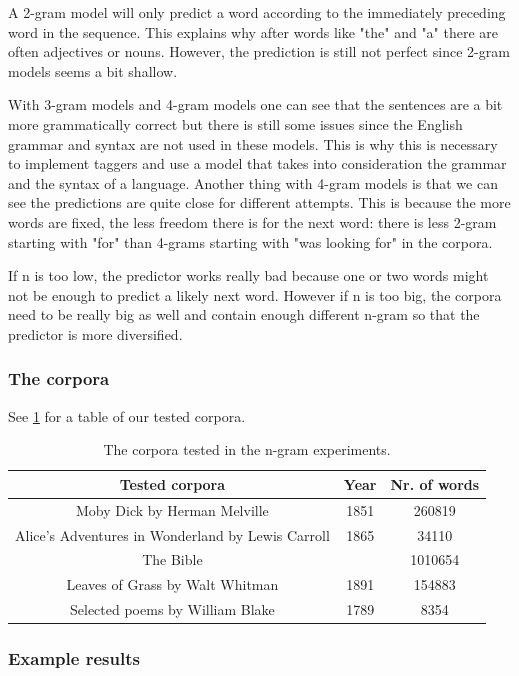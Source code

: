 \documentclass[a4paper,12pt]{article}
\begin{document}
A 2-gram model will only predict a word according to the immediately preceding word in the sequence. This explains why after words like "the" and "a" there are often adjectives or nouns. However, the prediction is still not perfect since 2-gram models seems a bit shallow.

With 3-gram models and 4-gram models one can see that the sentences are a bit more grammatically correct but there is still some issues since the English grammar and syntax are not used in these models. This is why this is necessary to implement taggers and use a model that takes into consideration the grammar and the syntax of a language. Another thing with 4-gram models is that we can see the predictions are quite close for different attempts. This is because the more words are fixed, the less freedom there is for the next word: there is less 2-gram starting with "for" than 4-grams starting with "was looking for" in the corpora.
	
If n is too low, the predictor works really bad because one or two words might not be enough to predict a likely next word. However if n is too big, the corpora need to be really big as well and contain enough different n-gram so that the predictor is more diversified.

\subsubsection{The corpora}
See \ref{tab:corpora1} for a table of our tested corpora.
\begin{table}
\begin{center}
\begin{tabular}{|c|c|c|}
\hline
Tested corpora & Year & Nr. of words \\ \hline
Moby Dick by Herman Melville & 1851 & 260819\\ \hline
Alice's Adventures in Wonderland by Lewis Carroll & 1865 & 34110 \\ \hline
The Bible & & 1010654 \\ \hline
Leaves of Grass by Walt Whitman & 1891 & 154883\\ \hline
Selected poems by William Blake & 1789 & 8354 \\ \hline
\end{tabular}
\caption{The corpora tested in the n-gram experiments.}
\label{tab:corpora1}
\end{center}
\end{table}

\subsubsection{Example results}
\end{document}

